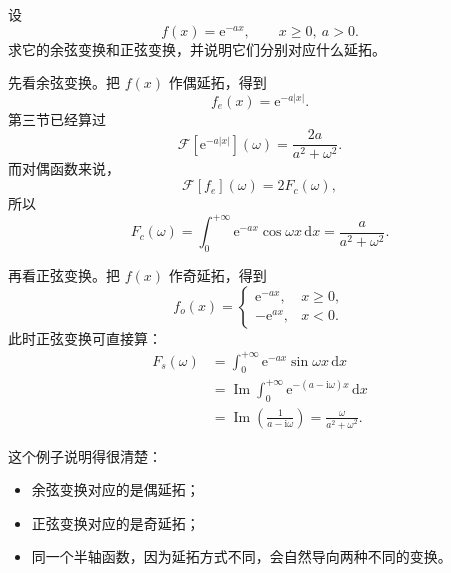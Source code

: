 \begin{lizi}{}{}
设
\begin{equation}
    f(x)=\mathrm{e}^{-ax}, \qquad x\ge 0,\ a>0.
\end{equation}
求它的余弦变换和正弦变换，并说明它们分别对应什么延拓。

\begin{jie}
先看余弦变换。把 $f(x)$ 作偶延拓，得到
\begin{equation}
    f_e(x)=\mathrm{e}^{-a|x|}.
\end{equation}
第三节已经算过
\begin{equation}
    \mathcal{F}[\mathrm{e}^{-a|x|}](\omega)=\frac{2a}{a^2+\omega^2}.
\end{equation}
而对偶函数来说，
\begin{equation}
    \mathcal{F}[f_e](\omega)=2F_c(\omega),
\end{equation}
所以
\begin{equation}
    F_c(\omega)=\int_0^{+\infty}\mathrm{e}^{-ax}\cos \omega x\,\mathrm{d}x
    =
    \frac{a}{a^2+\omega^2}.
\end{equation}

再看正弦变换。把 $f(x)$ 作奇延拓，得到
\begin{equation}
    f_o(x)=
    \begin{cases}
        \mathrm{e}^{-ax}, & x\ge 0, \\
        -\mathrm{e}^{ax}, & x<0.
    \end{cases}
\end{equation}
此时正弦变换可直接算：
\begin{align}
    F_s(\omega)
    &=
    \int_0^{+\infty}\mathrm{e}^{-ax}\sin \omega x\,\mathrm{d}x \\
    &=
    \operatorname{Im}
    \int_0^{+\infty}\mathrm{e}^{-(a-\mathrm{i}\omega)x}\,\mathrm{d}x \\
    &=
    \operatorname{Im}
    \left(\frac{1}{a-\mathrm{i}\omega}\right)
    =
    \frac{\omega}{a^2+\omega^2}.
\end{align}

这个例子说明得很清楚：
\begin{itemize}
    \item 余弦变换对应的是偶延拓；
    \item 正弦变换对应的是奇延拓；
    \item 同一个半轴函数，因为延拓方式不同，会自然导向两种不同的变换。
\end{itemize}
\end{jie}
\end{lizi}

